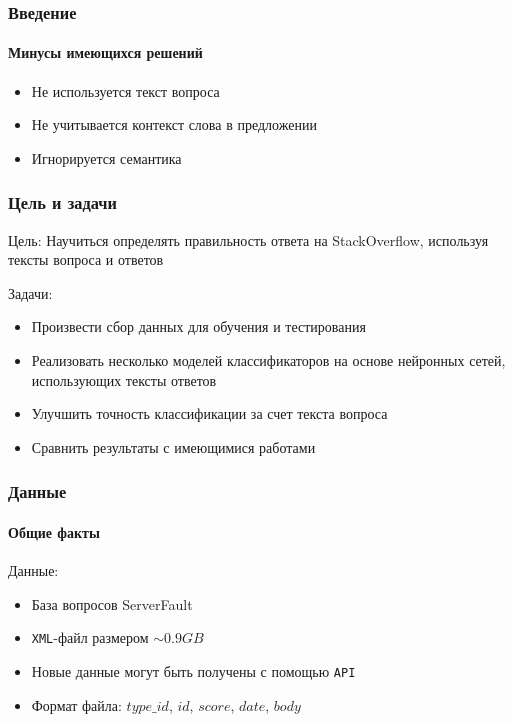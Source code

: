 \documentclass[10pt]{beamer}
\begin{document}

\begin{frame}
\frametitle{Введение}
\framesubtitle{Минусы имеющихся решений}

\begin{itemize}
	\setlength{\itemsep}{1em}
	\item Не используется текст вопроса
	\item Не учитывается контекст слова в предложении
	\item Игнорируется семантика
\end{itemize}

\end{frame}



\begin{frame}
\frametitle{Цель и задачи}

Цель: Научиться определять правильность ответа на StackOverflow, используя тексты вопроса и ответов

\medskip

Задачи:
\begin{itemize}
	\item Произвести сбор данных для обучения и тестирования
	\item Реализовать несколько моделей классификаторов на основе нейронных сетей, использующих тексты ответов
	\item Улучшить точность классификации за счет текста вопроса
	\item Сравнить результаты с имеющимися работами
\end{itemize}


\end{frame}


\begin{frame}
\frametitle{Данные}
\framesubtitle{Общие факты}

Данные:

\begin{itemize}
	\item База вопросов ServerFault
	\item \texttt{XML}-файл размером $\sim0.9GB$
	\item Новые данные могут быть получены с помощью \texttt{API}
	\item Формат файла: $type\_id$, $id$, $score$, $date$, $body$
\end{itemize}

\end{frame}
\end{document}
